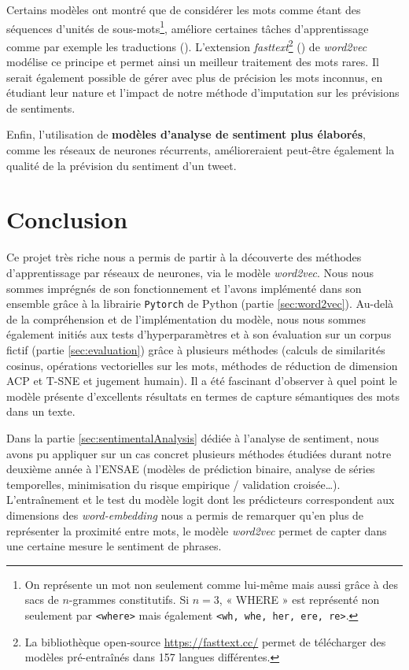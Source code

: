 \documentclass[11pt,french,french]{article}
\let\rmarkdownfootnote\footnote%
\def\footnote{\protect\rmarkdownfootnote}
\begin{document}
Certains modèles ont montré que de considérer les mots comme étant des séquences d'unités de sous-mots\footnote{On représente un mot non seulement comme lui-même mais aussi grâce à des sacs de \(n\)-grammes constitutifs. Si \(n = 3\), « WHERE » est représenté non seulement par \texttt{\textless{}where\textgreater{}} mais également \texttt{\textless{}wh,\ whe,\ her,\ ere,\ re\textgreater{}}.}, améliore certaines tâches d'apprentissage comme par exemple les traductions (\cite{Sennrich}).
L'extension \emph{fasttext}\footnote{La bibliothèque open-source \url{https://fasttext.cc/} permet de télécharger des modèles pré-entraînés dans 157 langues différentes.} (\cite{Bojanowski}) de \emph{word2vec} modélise ce principe et permet ainsi un meilleur traitement des mots rares.
Il serait également possible de gérer avec plus de précision les mots inconnus, en étudiant leur nature et l'impact de notre méthode d'imputation sur les prévisions de sentiments.

Enfin, l'utilisation de \textbf{modèles d'analyse de sentiment plus élaborés}, comme les réseaux de neurones récurrents, amélioreraient peut-être également la qualité de la prévision du sentiment d'un tweet.

\newpage

\hypertarget{conclusion}{%
\section*{Conclusion}\label{conclusion}}

Ce projet très riche nous a permis de partir à la découverte des méthodes d'apprentissage par réseaux de neurones, via le modèle \emph{word2vec}.
Nous nous sommes imprégnés de son fonctionnement et l'avons implémenté dans son ensemble grâce à la librairie \texttt{Pytorch} de Python (partie \ref{sec:word2vec}).
Au-delà de la compréhension et de l'implémentation du modèle, nous nous sommes également initiés aux tests d'hyperparamètres et à son évaluation sur un corpus fictif (partie \ref{sec:evaluation}) grâce à plusieurs méthodes (calculs de similarités cosinus, opérations vectorielles sur les mots, méthodes de réduction de dimension ACP et T-SNE et jugement humain).
Il a été fascinant d'observer à quel point le modèle présente d'excellents résultats en termes de capture sémantiques des mots dans un texte.

Dans la partie \ref{sec:sentimentalAnalysis} dédiée à l'analyse de sentiment, nous avons pu appliquer sur un cas concret plusieurs méthodes étudiées durant notre deuxième année à l'ENSAE (modèles de prédiction binaire, analyse de séries temporelles, minimisation du risque empirique / validation croisée\dots).
L'entraînement et le test du modèle logit dont les prédicteurs correspondent aux dimensions des \emph{word-embedding} nous a permis de remarquer qu'en plus de représenter la proximité entre mots, le modèle \emph{word2vec} permet de capter dans une certaine mesure le sentiment de phrases.
\end{document}

